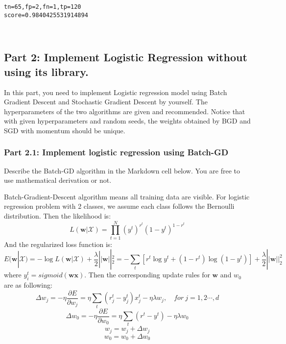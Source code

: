 \documentclass[11pt]{article}
\begin{document}
    \begin{Verbatim}[commandchars=\\\{\}]
tn=65,fp=2,fn=1,tp=120
score=0.9840425531914894
    \end{Verbatim}

    \begin{center}
    \end{center}
    { \hspace*{\fill} \\}
    
    \hypertarget{part-2-implement-logistic-regression-without-using-its-library.}{%
\subsection{Part 2: Implement Logistic Regression without using its
library.}\label{part-2-implement-logistic-regression-without-using-its-library.}}

    In this part, you need to implement Logistic regression model using
Batch Gradient Descent and Stochastic Gradient Descent by yourself. The
hyperparameters of the two algorithms are given and recommended. Notice
that with given hyperparameters and random seeds, the weights obtained
by BGD and SGD with momentum should be unique.

    \hypertarget{part-2.1-implement-logistic-regression-using-batch-gd}{%
\subsubsection{Part 2.1: Implement logistic regression using
Batch-GD}\label{part-2.1-implement-logistic-regression-using-batch-gd}}

    Describe the Batch-GD algorithm in the Markdown cell below. You are free
to use mathematical derivation or not.

    Batch-Gradient-Descent algorithm means all training data are visible.
For logistic regression problem with 2 classes, we assume each class
follows the Bernoulli distribution. Then the likelihood is:
\[L(\mathbf{w}|\mathcal{X})=\prod_{t=1}^N(y^t)^{r^t}(1-y^t)^{1-r^t}\]
And the regularized loss function is:
\[E(\mathbf{w}|\mathcal{X})=-\log{L(\mathbf{w}|\mathcal{X})}+\frac{\lambda}{2}||\mathbf{w}||_2^2=-\sum_t\left[r^t\log{y^t}+(1-r^t)\log{(1-y^t)}\right]+\frac{\lambda}{2}||\mathbf{w}||_2^2\]
where \(y_i^t = sigmoid(\mathbf{wx})\). Then the corresponding update
rules for \(\mathbf{w}\) and \(w_0\) are as following:
\[\Delta w_j=-\eta\frac{\partial E}{\partial w_j}=\eta\sum_t(r_j^t-y_j^t)x_j^t-\eta\lambda w_j,\quad for\ j=1,2\cdots,d\]
\[\Delta w_0=-\eta\frac{\partial E}{\partial w_0}=\eta\sum_t(r^t-y^t)-\eta\lambda w_0\]
\[w_j = w_j + \Delta w_j\] \[w_0 = w_0 + \Delta w_0\]
\end{document}
